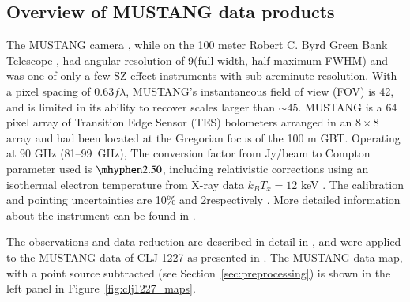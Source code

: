 \documentclass[twocolumn,traditabstract]{aa}
\begin{document}
\subsection{Overview of MUSTANG data products}
\label{sec:musobs}
The MUSTANG camera \citep{dicker2008}, while on the 100 meter Robert C. Byrd Green Bank Telescope
\citep[GBT, ][]{jewell2004}, had angular resolution of 9\asec (full-width, half-maximum FWHM) and was one of only
a few SZ effect instruments with sub-arcminute resolution. With a pixel spacing of 0.63$f \lambda$, MUSTANG's
instantaneous field of view (FOV) is 42\asecs, and is limited in its ability to recover scales larger than $\sim45$\asec.
MUSTANG is a 64 pixel array of Transition Edge Sensor (TES) bolometers arranged in an $8 \times 8$ array
and had been located at the Gregorian focus of the 100 m GBT. Operating at 90 GHz (81--99~GHz),
The conversion factor from Jy/beam to Compton parameter used is $\mhyphen 2.50$, including relativistic
corrections using an isothermal electron temperature from X-ray data $k_B T_x = 12$ keV \citep{sayers2013}.
The calibration and pointing uncertainties are 10\% and 2\asec respectively \citet{romero2017}.
More detailed information about the instrument can be found in \citet{dicker2008}. 

The observations and data reduction are described in detail in \citet{romero2015a}, and were applied to the MUSTANG
data of CLJ 1227 as presented in \citet{romero2017}.
The MUSTANG data map, with a point source subtracted (see Section~\ref{sec:preprocessing})
is shown in the left panel in Figure~\ref{fig:clj1227_maps}.
\end{document}
